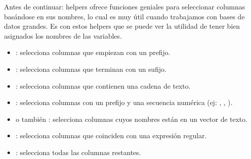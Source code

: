 \documentclass[8pt]{beamer}
\begin{document}
\begin{frame}[fragile]{Antes de continuar: helpers}
	 ofrece funciones geniales para seleccionar columnas basándose en sus nombres, lo cual es muy útil cuando trabajamos con bases de datos grandes. Es con estos helpers que se puede ver la utilidad de tener bien asignados los nombres de las variables.

	\begin{itemize}
		\item {}: selecciona columnas que empiezan con un prefijo.
		\item {}: selecciona columnas que terminan con un sufijo.
		\item {}: selecciona columnas que contienen una cadena de texto.
		\item {}: selecciona columnas con un prefijo y una secuencia numérica (ej: , , ).
		\item {} o tambi\'en : selecciona columnas cuyos nombres están en un vector de texto.
		\item {}: selecciona columnas que coinciden con una expresión regular.
		\item {}: selecciona todas las columnas restantes.
	\end{itemize}
\end{frame}
\end{document}
